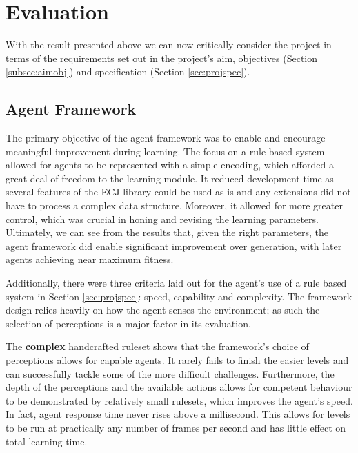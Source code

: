 
\section{Evaluation}

With the result presented above we can now critically consider the project in terms of the requirements set out in the project's aim, objectives (Section \ref{subsec:aimobj}) and specification (Section \ref{sec:projspec}).


\subsection{Agent Framework}

The primary objective of the agent framework was to enable and encourage meaningful improvement during learning. The focus on a rule based system allowed for agents to be represented with a simple encoding, which afforded a great deal of freedom to the learning module. It reduced development time as several features of the ECJ library could be used as is and any extensions did not have to process a complex data structure. Moreover, it allowed for more greater control, which was crucial in honing and revising the learning parameters. Ultimately, we can see from the results that, given the right parameters, the agent framework did enable significant improvement over generation, with later agents achieving near maximum fitness.

Additionally, there were three criteria laid out for the agent's use of a rule based system in Section \ref{sec:projspec}: speed, capability and complexity. The framework design relies heavily on how the agent senses the environment; as such the selection of perceptions is a major factor in its evaluation.

The \textbf{complex} handcrafted ruleset shows that the framework's choice of perceptions allows for capable agents. It rarely fails to finish the easier levels and can successfully tackle some of the more difficult challenges. Furthermore, the depth of the perceptions and the available actions allows for competent behaviour to be demonstrated by relatively small rulesets, which improves the agent's speed. In fact, agent response time never rises above a millisecond. This allows for levels to be run at practically any number of frames per second and has little effect on total learning time.

